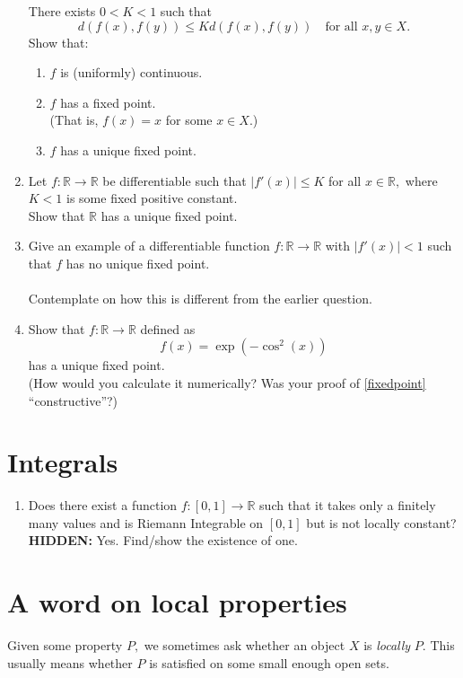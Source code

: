 \documentclass[12pt]{article}
\theoremstyle{definition}
\numberwithin{thm}{section}
\newcommand{\hint}[1]{\textbf{HIDDEN:} {\color[rgb]{0.95, 0.95, 0.95}#1}}
\begin{document}
\begin{enumerate}
	There exists $0 < K < 1$ such that
	\begin{equation*} 
		d(f(x), f(y)) \le Kd(f(x), f(y)) \quad \text{for all } x, y \in X.
	\end{equation*}
	Show that:
	\begin{enumerate}
		\item $f$ is (uniformly) continuous.
		\item \label{fixedpoint} $f$ has a fixed point.\\
		(That is, $f(x) = x$ for some $x \in X$.)
		\item $f$ has a unique fixed point.
	\end{enumerate}
	\item Let $f:\mathbb{R} \to \mathbb{R}$ be differentiable such that $|f'(x)| \le K$ for all $x \in \mathbb{R},$ where $K < 1$ is some fixed positive constant.\\
	Show that $\mathbb{R}$ has a unique fixed point.
	\item Give an example of a differentiable function $f:\mathbb{R} \to \mathbb{R}$ with $|f'(x)| < 1$ such that $f$ has no unique fixed point.\\~\\
	Contemplate on how this is different from the earlier question.
	\item Show that $f:\mathbb{R} \to \mathbb{R}$ defined as 
	\begin{equation*} 
		f(x) = \exp\left(-\cos^2(x)\right)
	\end{equation*}
	has a unique fixed point.\\
	(How would you calculate it numerically? Was your proof of \ref{fixedpoint} ``constructive''?)
\end{enumerate}
\newpage\section{Integrals}
\begin{enumerate}
	\item Does there exist a function $f:[0, 1] \to \mathbb{R}$ such that it takes only a finitely many values and is Riemann Integrable on $[0, 1]$ but is not locally constant?\\
	\hint{Yes. Find/show the existence of one.}
\end{enumerate}
\newpage\section{A word on local properties}
Given some property $P,$ we sometimes ask whether an object $X$ is \emph{locally} $P$. This usually means whether $P$ is satisfied on some small enough open sets.\\
\end{document}
